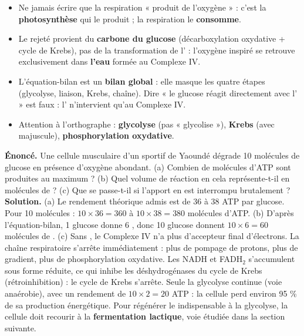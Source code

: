 \documentclass[11pt]{article}
\begin{document}
\begin{attention}
\begin{itemize}
\item Ne jamais écrire que la respiration « produit de l'oxygène » : c'est la \textbf{photosynthèse} qui le produit ; la respiration le \textbf{consomme}.
\item Le  rejeté provient du \textbf{carbone du glucose} (décarboxylation oxydative + cycle de Krebs), pas de la transformation de l' : l'oxygène inspiré se retrouve exclusivement dans \textbf{l'eau} formée au Complexe IV.
\item L'équation-bilan est un \textbf{bilan global} : elle masque les quatre étapes (glycolyse, liaison, Krebs, chaîne). Dire « le glucose réagit directement avec l' » est faux : l' n'intervient qu'au Complexe IV.
\item Attention à l'orthographe : \textbf{glycolyse} (pas « glycolise »), \textbf{Krebs} (avec majuscule), \textbf{phosphorylation oxydative}.
\end{itemize}
\end{attention}

\begin{exoresolu}
\textbf{Énoncé.} Une cellule musculaire d'un sportif de Yaoundé dégrade 10 molécules de glucose en présence d'oxygène abondant. (a) Combien de molécules d'ATP sont produites au maximum ? (b) Quel volume de réaction en  cela représente-t-il en molécules de  ? (c) Que se passe-t-il si l'apport en  est interrompu brutalement ?
\tcblower
\textbf{Solution.} 
(a) Le rendement théorique admis est de 36 à 38 ATP par glucose. Pour 10 molécules : $10 \times 36 = 360$ à $10 \times 38 = 380$ molécules d'ATP.
(b) D'après l'équation-bilan, 1 glucose donne 6 , donc 10 glucose donnent $10 \times 6 = 60$ molécules de .
(c) Sans , le Complexe IV n'a plus d'accepteur final d'électrons. La chaîne respiratoire s'arrête immédiatement : plus de pompage de protons, plus de gradient, plus de phosphorylation oxydative. Les NADH et FADH$_2$ s'accumulent sous forme réduite, ce qui inhibe les déshydrogénases du cycle de Krebs (rétroinhibition) : le cycle de Krebs s'arrête. Seule la glycolyse continue (voie anaérobie), avec un rendement de $10 \times 2 = 20$ ATP : la cellule perd environ 95 \% de sa production énergétique. Pour régénérer le  indispensable à la glycolyse, la cellule doit recourir à la \textbf{fermentation lactique}, voie étudiée dans la section suivante.
\end{exoresolu}
\end{document}
